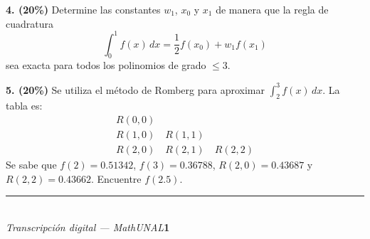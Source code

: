 \documentclass[11pt]{article}
\begin{document}
\vspace{5mm}
\noindent\textbf{4. (20\%)} Determine las constantes $w_1$, $x_0$ y $x_1$ de manera que la regla de cuadratura
\[
\int_0^1 f(x)\,dx=\frac12 f(x_0)+w_1f(x_1)
\]
sea exacta para todos los polinomios de grado $\leq 3$.

\vspace{5mm}
\noindent\textbf{5. (20\%)} Se utiliza el método de Romberg para aproximar $\displaystyle\int_2^3 f(x)\,dx$. La tabla es:
\[
\begin{array}{l}
R(0,0)\\
R(1,0)\quad R(1,1)\\
R(2,0)\quad R(2,1)\quad R(2,2)
\end{array}
\]
Se sabe que $f(2)=0.51342$, $f(3)=0.36788$, $R(2,0)=0.43687$ y $R(2,2)=0.43662$. Encuentre $f(2.5)$.

\vfill
\rule{\linewidth}{0.4pt}\\[1pt]
{\scriptsize\textit{Transcripción digital --- MathUNAL}\hfill\textcolor{unalblue}{\textbf{1}}}
\end{document}
